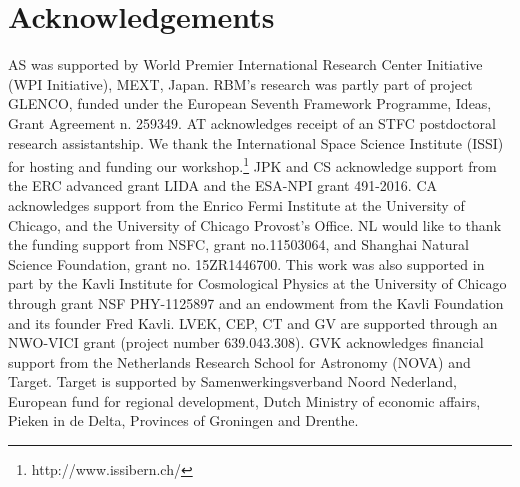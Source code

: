 \documentclass{aa}
\begin{document}
\section*{Acknowledgements}
AS was supported by World Premier International Research Center Initiative (WPI Initiative), MEXT, Japan.
RBM's research was partly part of project GLENCO, funded under the European Seventh Framework Programme, Ideas, Grant Agreement n. 259349. AT acknowledges receipt of an STFC postdoctoral research
assistantship.
We thank the International Space Science Institute (ISSI) for hosting and funding our workshop.\footnote{http://www.issibern.ch/}
JPK and CS acknowledge support from the ERC advanced grant LIDA and the ESA-NPI grant 491-2016.
CA acknowledges support from the Enrico Fermi
Institute at the University of Chicago, and the University of Chicago
Provost's Office. NL would like to thank the funding support from
NSFC, grant no.11503064, and Shanghai Natural Science Foundation,
grant no. 15ZR1446700. This work was also supported in part by the
Kavli Institute for Cosmological Physics at the University of Chicago
through grant NSF PHY-1125897 and an endowment from the Kavli
Foundation and its founder Fred Kavli. LVEK, CEP, CT and GV are supported through an NWO-VICI grant (project number 639.043.308). GVK acknowledges
financial support from the Netherlands Research School for
Astronomy (NOVA) and Target. Target is supported by
Samenwerkingsverband Noord Nederland, European fund for regional
development, Dutch Ministry of economic affairs, Pieken in de
Delta, Provinces of Groningen and Drenthe. 






\appendix

\label{lastpage}
\end{document}
